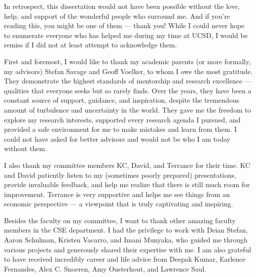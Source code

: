 \begin{acknowledgements}
In retrospect, this dissertation would not have been possible without the love, help,  and support of the wonderful people who surround me. And if you're reading this, you might be one of them --- thank you!
While I could never hope to enumerate everyone who has helped me during my time at UCSD, I would be remiss if I did not at least attempt to acknowledge them. 


First and foremost, I would like to thank my academic parents (or more formally, my advisors) Stefan Savage and Geoff Voelker,
to whom I owe the most gratitude. They demonstrate the highest standards of mentorship and research excellence --- qualities that everyone seeks but so rarely finds.
Over the years, they have been a constant source of support, guidance, and inspiration, despite the tremendous amount of turbulence and uncertainty in the world. They gave me the freedom to explore my research interests, supported every research agenda I pursued, and provided a safe environment for me to make mistakes and learn from them. I could not have asked for better advisors and would not be who I am today without them.


I also thank my committee members KC, David, and Terrance for their time. KC and David patiently listen to my (sometimes poorly prepared) presentations, provide invaluable feedback, and help me realize that there is still much room for improvement. Terrance is very supportive and helps me see things from an economic perspective --- a viewpoint that is truly captivating and inspiring.

Besides the faculty on my committee, I want to thank other amazing faculty members in the CSE  department. I had the privilege to work with Deian Stefan, Aaron Schulman, Kristen Vacarro, and Imani Munyaka, who 
guided me through various projects and generously shared their expertise with me. I am also grateful to have received incredibly career and life advice from Deepak Kumar, Earlence Fernandes, Alex C. Snoeren, Amy Ousterhout, and Lawrence Saul.


\end{acknowledgements}
